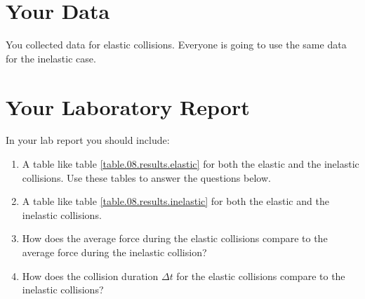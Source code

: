\section{Your Data}
You collected data for elastic collisions. Everyone is going to use the same data for the inelastic case.
\section{Your Laboratory Report}
In your lab report you should include:
\begin{enumerate}
    \item A table like table \ref{table.08.results.elastic} for both the elastic and the inelastic collisions. Use these tables to answer the questions below.
    \item A table like table \ref{table.08.results.inelastic} for both the elastic and the inelastic collisions.
    \item How does the average force during the elastic collisions compare to the average force during the inelastic collision?
    \item How does the collision duration $\Delta t$ for the elastic collisions compare to the inelastic collisions?
\end{enumerate}